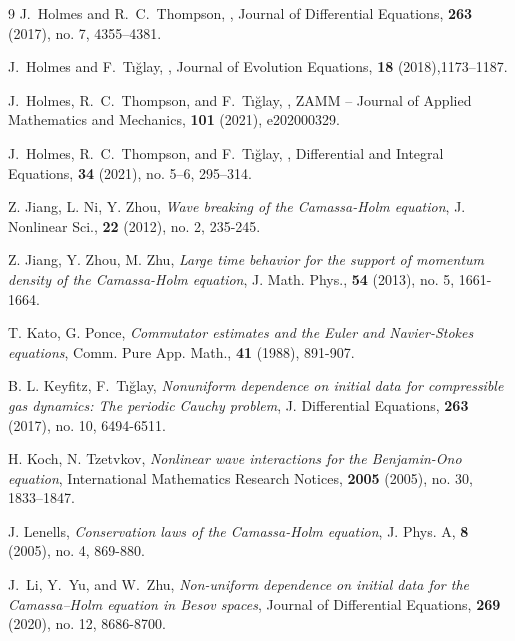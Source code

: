 \documentclass[reqno]{amsart}
\theoremstyle{plain}
\numberwithin{equation}{section}
\begin{document}
\begin{thebibliography}{9}
J.~Holmes and R.~C.~Thompson,
,
\newblock Journal of Differential Equations, \textbf{263} (2017), no. 7, 4355–4381.

J.~Holmes and F.~Tığlay,
,
\newblock Journal of Evolution Equations, \textbf{18} (2018),1173–1187.

J.~Holmes, R.~C.~Thompson, and F.~Tığlay,
,
\newblock ZAMM – Journal of Applied Mathematics and Mechanics, \textbf{101} (2021), e202000329.

J.~Holmes, R.~C.~Thompson, and F.~Tığlay,
,
\newblock Differential and Integral Equations, \textbf{34} (2021), no. 5–6, 295–314.

Z. Jiang, L. Ni, Y. Zhou, \textit{Wave breaking of the Camassa-Holm equation}, J. Nonlinear Sci., \textbf{22} (2012), no. 2, 235-245.

Z. Jiang, Y. Zhou, M. Zhu, \textit{Large time behavior for the support of momentum density of the Camassa-Holm equation}, J. Math. Phys., \textbf{54} (2013), no. 5, 1661-1664.


T. Kato, G. Ponce, 
 \textit{Commutator estimates and the Euler and Navier-Stokes equations}, Comm.
Pure App. Math., \textbf{41}  (1988), 891-907.


B. L. Keyfitz, F.~Tığlay, \textit{Nonuniform dependence on initial data for compressible gas dynamics: The periodic Cauchy problem}, J. Differential Equations, \textbf{263} (2017), no. 10, 6494-6511.

H. Koch, N. Tzetvkov, \textit{Nonlinear wave interactions for the Benjamin-Ono equation}, International Mathematics Research Notices, \textbf{2005} (2005), no. 30, 1833–1847.

J. Lenells, \textit{Conservation laws of the Camassa-Holm equation}, J. Phys. A, \textbf{8} (2005), no. 4, 869-880.

J.~Li, Y.~Yu, and W.~Zhu,
\newblock \textit{Non-uniform dependence on initial data for the Camassa–Holm equation in Besov spaces},
\newblock Journal of Differential Equations, \textbf{269} (2020), no. 12, 8686-8700.


\end{thebibliography}
\end{document}
